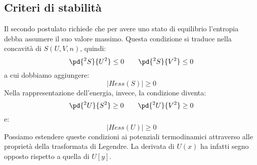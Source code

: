 \documentclass{article}
\begin{document}
\subsection{Criteri di stabilità}
Il secondo postulato richiede che per avere uno stato di equilibrio l'entropia debba assumere il suo valore massimo. Questa condizione si traduce nella concavità di $S(U,V,n)$, quindi:
$$ \pd{^2S}{U^2}\leq0 \qquad \pd{^2S}{V^2}\leq0 $$
a cui dobbiamo aggiungere:
$$ |Hess(S)| \geq 0 $$
Nella rappresentazione dell'energia, invece, la condizione diventa:
$$ \pd{^2U}{S^2}\geq0 \qquad \pd{^2U}{V^2}\geq0 $$
e:
$$ |Hess(U)|\geq0 $$
Possiamo estendere queste condizioni ai potenziali termodinamici attraverso alle proprietà della trasformata di Legendre. La derivata di $U(x)$ ha infatti segno opposto rispetto a quella di $U[y]$.








\Index
\end{document}
